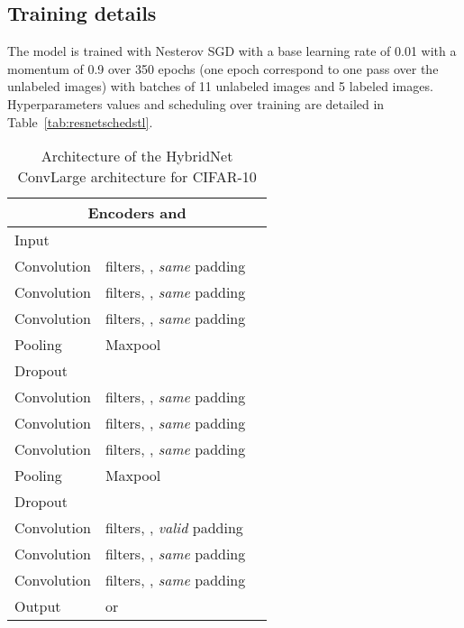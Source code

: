 \documentclass[runningheads]{llncs}
\begin{document}
\subsection{Training details}

The model is trained with Nesterov SGD with a base learning rate of 0.01 with a momentum of 0.9 over 350 epochs (one epoch correspond to one pass over the unlabeled images) with batches of 11 unlabeled images and 5 labeled images. Hyperparameters values and scheduling over training are detailed in Table~\ref{tab:resnetschedstl}.



\begin{table}[htbp]
\centering
\caption{Architecture of the HybridNet ConvLarge architecture for CIFAR-10}
\label{tab:convlarge}
\begin{threeparttable}
\setlength{\tabcolsep}{4pt}
\begin{tabular}{ l l l}
\toprule
\multicolumn{3}{c}{\textbf{Encoders  and }} \\
\midrule
Input &  &  \\
Convolution &  filters, , \textit{same} padding &  \\
Convolution &  filters, , \textit{same} padding &  \\
Convolution &  filters, , \textit{same} padding &  \\
Pooling   & Maxpool  &  \\
Dropout   &   &  \\
Convolution &  filters, , \textit{same} padding  &  \\
Convolution &  filters, , \textit{same} padding  &  \\
Convolution &  filters, , \textit{same} padding  &  \\
Pooling & Maxpool   &  \\
Dropout &   &  \\
Convolution &  filters, , \textit{valid} padding  &  \\
Convolution &  filters, , \textit{same} padding &  \\
Convolution &  filters, , \textit{same} padding &  \\
Output &  or  &  \\


\end{tabular}
\end{threeparttable}
\end{table}
\end{document}
